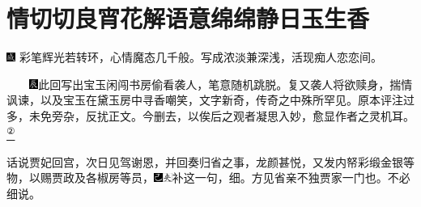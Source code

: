 

\chapter{情切切良宵花解语\hspace{.5em}意绵绵静日玉生香}

{\includegraphics[width=3mm]{../Images/00005}  \kaishu 彩笔辉光若转环，心情魔态几千般。写成浓淡兼深浅，活现痴人恋恋间。}

{　　\includegraphics[width=3mm]{../Images/00009}此回写出宝玉闲闯书房偷看袭人，笔意随机跳脱。复又袭人将欲赎身，揣情讽谏，以及宝玉在黛玉房中寻香嘲笑，文字新奇，传奇之中殊所罕见。原本评注过多，未免旁杂，反扰正文。今删去，以俟后之观者凝思入妙，愈显作者之灵机耳。}\href{../Text/part0023_split_000.html\#lnkback_2_a}{\textsuperscript{②}}{}

话说贾妃回宫，次日见驾谢恩，并回奏归省之事，龙颜甚悦，又发内帑彩缎金银等物，以赐贾政及各椒房等员，{\includegraphics[width=3mm]{../Images/00003}\includegraphics[width=3mm]{../Images/00012}\footnotesize \kaishu 补这一句，细。方见省亲不独贾家一门也。}不必细说。

